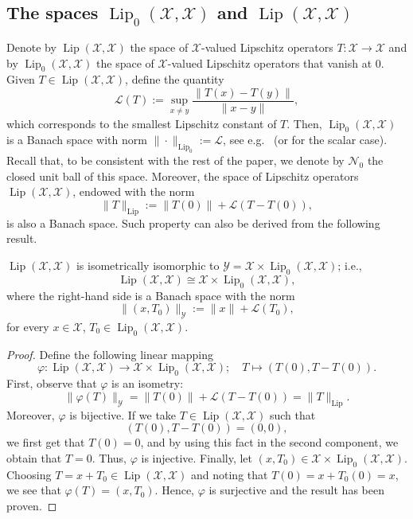 \documentclass[onefignum,onetabnum]{siamonline250211}
\newcommand{\Lip}{\operatorname{Lip}}
\newcommand{\cL}{\mathcal{L}}
\newcommand{\cX}{\mathcal{X}}
\begin{document}
\subsection{\texorpdfstring{The spaces $\Lip_0(\cX, \cX)$ and $\Lip(\cX, \cX)$}{The spaces Lip0(X) and Lip(X)}} Denote by $\Lip(\cX, \cX)$ the space of $\cX$-valued Lipschitz operators $T\colon \cX\to\cX$ and by $\Lip_0(\cX, \cX)$ the space of $\cX$-valued Lipschitz operators that vanish at $0$. Given $T\in\Lip(\cX, \cX)$, define the quantity
$$
\cL(T):=\sup_{x\neq y} \frac{\|T(x)-T(y)\|}{\|x-y\|},
$$
which corresponds to the smallest Lipschitz constant of $T$. Then, $\Lip_0(\cX, \cX)$ is a Banach space with norm $\|\cdot\|_{\Lip_0}:=\cL$, see e.g.~\cite{Guerrero2018} (or \cite{Weaver} for the scalar case). Recall that, to be consistent with the rest of the paper, we denote by $\mathcal{N}_0$ the closed unit ball of this space. Moreover, the space of Lipschitz operators $\Lip(\cX, \cX)$, endowed with the norm
$$
\|T\|_{\Lip}:=\|T(0)\|+\cL(T-T(0)),
$$
is also a Banach space. Such property can also be derived from the following result.
\begin{proposition}\label{iota}
$\Lip(\cX, \cX)$ is isometrically isomorphic to $\mathcal{Y}=\cX\times\Lip_0(\cX, \cX)$; i.e.,
$$
\Lip(\cX, \cX)\cong \cX\times \Lip_0(\cX, \cX),
$$
where the right-hand side is a Banach space with the norm
$$
\|(x,T_0)\|_{\mathcal{Y}}:= \|x\|+\cL(T_0),
$$
for every $x\in\cX$, $T_0\in \Lip_0(\cX, \cX)$.
\end{proposition}
\begin{proof} Define the following linear mapping
$$
\varphi\colon\Lip(\cX, \cX)\rightarrow \cX\times\Lip_0(\cX, \cX); \quad T\mapsto (T(0), T-T(0)).
$$
First, observe that $\varphi$ is an isometry:
$$
\|\varphi(T)\|_{\mathcal{Y}}=\|T(0)\|+\cL(T-T(0))=\|T\|_{\Lip}.
$$
Moreover, $\varphi$ is bijective. If we take $T\in\Lip(\cX, \cX)$ such that
$$
(T(0),T-T(0))=(0,0),
$$
we first get that $T(0)=0$, and by using this fact in the second component, we obtain that $T=0$. Thus, $\varphi$ is injective. Finally, let $(x,T_0)\in \cX\times\Lip_0(\cX, \cX)$. Choosing $T=x+T_0\in\Lip(\cX, \cX)$ and noting that $T(0)=x+T_0(0)=x$, we see that $\varphi(T)=(x, T_0)$. Hence, $\varphi$ is surjective and the result has been proven.
\end{proof}
\end{document}
